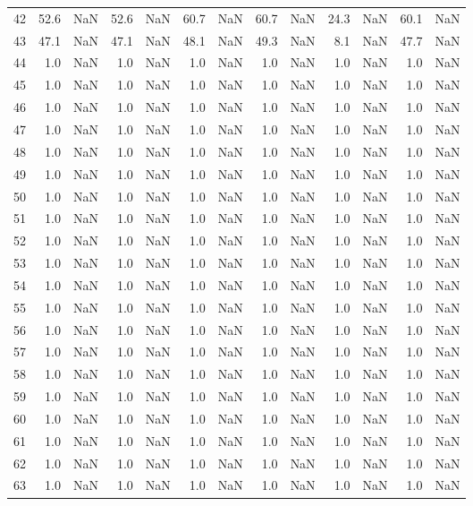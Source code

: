 \begin{tabular}{lrrrrrrrrrrrr}
42 & 52.6 & NaN & 52.6 & NaN & 60.7 & NaN & 60.7 & NaN & 24.3 & NaN & 60.1 & NaN \\
43 & 47.1 & NaN & 47.1 & NaN & 48.1 & NaN & 49.3 & NaN & 8.1 & NaN & 47.7 & NaN \\
44 & 1.0 & NaN & 1.0 & NaN & 1.0 & NaN & 1.0 & NaN & 1.0 & NaN & 1.0 & NaN \\
45 & 1.0 & NaN & 1.0 & NaN & 1.0 & NaN & 1.0 & NaN & 1.0 & NaN & 1.0 & NaN \\
46 & 1.0 & NaN & 1.0 & NaN & 1.0 & NaN & 1.0 & NaN & 1.0 & NaN & 1.0 & NaN \\
47 & 1.0 & NaN & 1.0 & NaN & 1.0 & NaN & 1.0 & NaN & 1.0 & NaN & 1.0 & NaN \\
48 & 1.0 & NaN & 1.0 & NaN & 1.0 & NaN & 1.0 & NaN & 1.0 & NaN & 1.0 & NaN \\
49 & 1.0 & NaN & 1.0 & NaN & 1.0 & NaN & 1.0 & NaN & 1.0 & NaN & 1.0 & NaN \\
50 & 1.0 & NaN & 1.0 & NaN & 1.0 & NaN & 1.0 & NaN & 1.0 & NaN & 1.0 & NaN \\
51 & 1.0 & NaN & 1.0 & NaN & 1.0 & NaN & 1.0 & NaN & 1.0 & NaN & 1.0 & NaN \\
52 & 1.0 & NaN & 1.0 & NaN & 1.0 & NaN & 1.0 & NaN & 1.0 & NaN & 1.0 & NaN \\
53 & 1.0 & NaN & 1.0 & NaN & 1.0 & NaN & 1.0 & NaN & 1.0 & NaN & 1.0 & NaN \\
54 & 1.0 & NaN & 1.0 & NaN & 1.0 & NaN & 1.0 & NaN & 1.0 & NaN & 1.0 & NaN \\
55 & 1.0 & NaN & 1.0 & NaN & 1.0 & NaN & 1.0 & NaN & 1.0 & NaN & 1.0 & NaN \\
56 & 1.0 & NaN & 1.0 & NaN & 1.0 & NaN & 1.0 & NaN & 1.0 & NaN & 1.0 & NaN \\
57 & 1.0 & NaN & 1.0 & NaN & 1.0 & NaN & 1.0 & NaN & 1.0 & NaN & 1.0 & NaN \\
58 & 1.0 & NaN & 1.0 & NaN & 1.0 & NaN & 1.0 & NaN & 1.0 & NaN & 1.0 & NaN \\
59 & 1.0 & NaN & 1.0 & NaN & 1.0 & NaN & 1.0 & NaN & 1.0 & NaN & 1.0 & NaN \\
60 & 1.0 & NaN & 1.0 & NaN & 1.0 & NaN & 1.0 & NaN & 1.0 & NaN & 1.0 & NaN \\
61 & 1.0 & NaN & 1.0 & NaN & 1.0 & NaN & 1.0 & NaN & 1.0 & NaN & 1.0 & NaN \\
62 & 1.0 & NaN & 1.0 & NaN & 1.0 & NaN & 1.0 & NaN & 1.0 & NaN & 1.0 & NaN \\
63 & 1.0 & NaN & 1.0 & NaN & 1.0 & NaN & 1.0 & NaN & 1.0 & NaN & 1.0 & NaN \\

\end{tabular}
